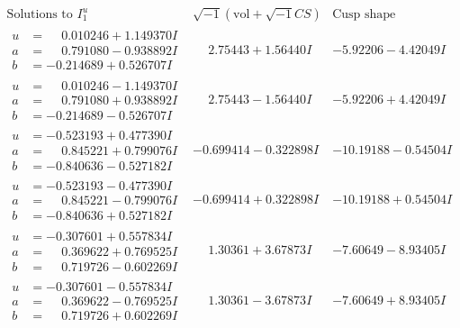\documentclass[1p]{elsarticle_modified}
\theoremstyle{definition}
\newcommand{\I}{\sqrt{-1}}
\begin{document}
$$\begin{array}{c|c|c}  
\text{Solutions to }I^u_{1}& \I (\text{vol} + \sqrt{-1}CS) & \text{Cusp shape}\\
 \hline 
\begin{aligned}
u &= \phantom{-}0.010246 + 1.149370 I \\
a &= \phantom{-}0.791080 - 0.938892 I \\
b &= -0.214689 + 0.526707 I\end{aligned}
 & \phantom{-}2.75443 + 1.56440 I & -5.92206 - 4.42049 I \\ \hline\begin{aligned}
u &= \phantom{-}0.010246 - 1.149370 I \\
a &= \phantom{-}0.791080 + 0.938892 I \\
b &= -0.214689 - 0.526707 I\end{aligned}
 & \phantom{-}2.75443 - 1.56440 I & -5.92206 + 4.42049 I \\ \hline\begin{aligned}
u &= -0.523193 + 0.477390 I \\
a &= \phantom{-}0.845221 + 0.799076 I \\
b &= -0.840636 - 0.527182 I\end{aligned}
 & -0.699414 - 0.322898 I & -10.19188 - 0.54504 I \\ \hline\begin{aligned}
u &= -0.523193 - 0.477390 I \\
a &= \phantom{-}0.845221 - 0.799076 I \\
b &= -0.840636 + 0.527182 I\end{aligned}
 & -0.699414 + 0.322898 I & -10.19188 + 0.54504 I \\ \hline\begin{aligned}
u &= -0.307601 + 0.557834 I \\
a &= \phantom{-}0.369622 + 0.769525 I \\
b &= \phantom{-}0.719726 - 0.602269 I\end{aligned}
 & \phantom{-}1.30361 + 3.67873 I & -7.60649 - 8.93405 I \\ \hline\begin{aligned}
u &= -0.307601 - 0.557834 I \\
a &= \phantom{-}0.369622 - 0.769525 I \\
b &= \phantom{-}0.719726 + 0.602269 I\end{aligned}
 & \phantom{-}1.30361 - 3.67873 I & -7.60649 + 8.93405 I \\ \hline\begin{aligned}

\end{aligned}
\end{array}$$
\end{document}
